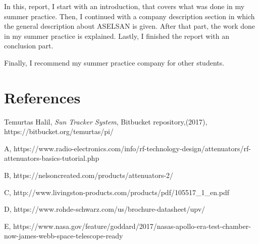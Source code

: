 	In this, report, I start with an introduction, that covers what was done in my summer practice. Then, I continued with a company description section in which the general description about ASELSAN is given. After that part, the work done in my summer practice is explained. Lastly, I finished the report with an conclusion part. 
		
	
	Finally, I recommend my summer practice company for other students. 



\section{References}

\begingroup
\renewcommand{\section}[2]{}%
\begin{thebibliography}{}

 Temurtas Halil,
	\textit{Sun Tracker System},
	Bitbucket repository,(2017),
	https://bitbucket.org/temurtas/pi/
	
	A,
	https://www.radio-electronics.com/info/rf-technology-design/attenuators/rf-attenuators-basics-tutorial.php

	B,
	https://nelsoncreated.com/products/attenuators-2/ 

	C,
	http://www.livingston-products.com/products/pdf/105517\_1\_en.pdf

	D,
	https://www.rohde-schwarz.com/us/brochure-datasheet/upv/

	E,
	https://www.nasa.gov/feature/goddard/2017/nasas-apollo-era-test-chamber-now-james-webb-space-telescope-ready



\end{thebibliography}
\endgroup

\vfill


\appendix









